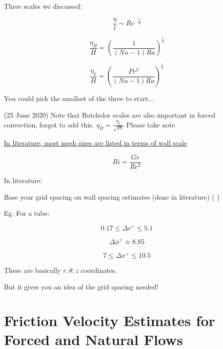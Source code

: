 \documentclass[12pt]{article}
\renewcommand{\_}{\kern-1.5pt\textunderscore\kern-1.5pt}
\begin{document}
Three scales we discussed:\par

 \[ \frac{ \eta }{l} \sim Re^{-\frac{3}{4}} \] \par

 \[ \frac{ \eta _{B}}{H}= \left( \frac{1}{ \left( Nu-1 \right) Ra} \right) ^{\frac{1}{4}} \] \par

 \[ \frac{ \eta _{k}}{H}= \left( \frac{Pr^{2}}{ \left( Nu-1 \right) Ra} \right) ^{\frac{1}{4}} \] \par

You could pick the smallest of the three to start$ \ldots $ \par


(25 June 2020) Note that Batchelor scales are also important in forced convection, forgot to add this. $\eta_{B}=\frac{\eta_{k}}{\sqrt{Pr}}$ Please take note.




\vspace{\baselineskip}
\uline{In literature, most mesh sizes are listed in terms of wall scale}\par

 \[ Ri=\frac{Gr}{Re^{2}} \] \par

In literature:\par

Base your grid spacing on wall spacing estimates (done in literature) (\cite{You2003} )\par

Eg. For a tube:\par

 \[ 0.17 \leq  \Delta r^{+} \leq 5.1 \] \par

 \[  \Delta  \phi ^{+} \approx 8.85 \] \par

 \[ 7 \leq  \Delta x^{+} \leq 10.5 \] \par

These are basically  \( r, \theta ,z \)  coordinates.\par

But it gives you an idea of the grid spacing needed!\par


\vspace{\baselineskip}

\vspace{\baselineskip}

\section{Friction Velocity Estimates for Forced and Natural Flows}
\end{document}
